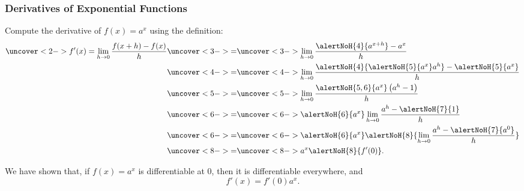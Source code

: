 \begin{frame}
\frametitle{Derivatives of Exponential Functions}
Compute the derivative of $f(x) = a^x$ using the definition:
\begin{align*}
\uncover<2->{f'(x) = \lim_{h\to 0} \frac{f(x+h)-f(x)}{h}} & \uncover<3->{=}  \uncover<3->{\lim_{h\to 0} \frac{\alertNoH{ 4}{a^{x+h}}-a^x}{h}}\\
& \uncover<4->{=}  \uncover<4->{\lim_{h\to 0} \frac{\alertNoH{ 4}{\alertNoH{ 5}{a^x} a^h}-\alertNoH{ 5}{a^x}}{h}}\\
& \uncover<5->{=}  \uncover<5->{\lim_{h\to 0} \frac{\alertNoH{ 5,6}{a^x} \left(a^h- 1\right) }{h}}\\
& \uncover<6->{=}  \uncover<6->{\alertNoH{ 6}{a^x} \lim_{h\to 0} \frac{a^h- \alertNoH{7}{1}}{h}}\\
& \uncover<6->{=}  \uncover<6->{\alertNoH{ 6}{a^x} \alertNoH{ 8}{\lim_{h\to 0} \frac{a^h- \alertNoH{7}{a^0}}{h}}}\\
& \uncover<8->{=}  \uncover<8->{a^x \alertNoH{ 8}{f'(0)}.}
\end{align*}
\end{frame}


\begin{frame}
We have shown that, if $f(x) = a^x$ is differentiable at 0, then it is differentiable everywhere, and
\[
f'(x) = f'(0)a^x .
\]
\end{frame}
